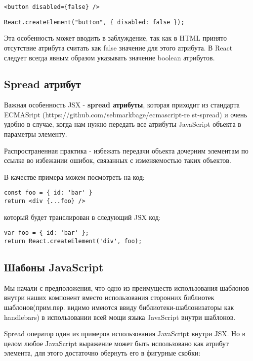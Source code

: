 \documentclass[12pt]{book}
\begin{document}
\begin{lstlisting}
<button disabled={false} />
\end{lstlisting}

\begin{lstlisting}
React.createElement("button", { disabled: false });
\end{lstlisting}
   
Эта особенность может вводить в заблуждение, так как в HTML принято отсутствие атрибута считать как false значение для этого атрибута. В React следует всегда явным образом указывать значение boolean атрибутов.

\subsection*{Spread атрибут}

Важная особенность JSX - \textbf{spread атрибуты}, которая приходит из стандарта ECMASript (https://github.com/sebmarkbage/ecmascript-re st-spread) и очень удобно в случае, когда нам нужно передать все атрибуты JavaScript объекта в параметры элементу.

Распространенная практика - избежать передачи объекта дочерним элементам по ссылке во избежании ошибок, связанных с изменяемостью таких объектов.

В качестве примера можем посмотреть на код:

\begin{lstlisting}
const foo = { id: 'bar' }
return <div {...foo} />
\end{lstlisting}
   
который будет транслирован в следующий JSX код:

\begin{lstlisting}
var foo = { id: 'bar' };
return React.createElement('div', foo);
\end{lstlisting}
   
\subsection*{Шабоны JavaScript}

Мы начали с предположения, что одно из преимуществ использования шаблонов внутри наших компонент вместо использования сторонних библиотек шаблонов(прим.пер. видимо имеются ввиду библиотеки-шаблонизаторы как handlebars) в использовании всей мощи языка JavaScript внутри шаблонов.

Spread оператор один из примеров использования JavaScript внутри JSX. Но в целом любое JavaScript выражение может быть использовано как атрибут элемента, для этого достаточно обернуть его в фигурные скобки:
\end{document}
